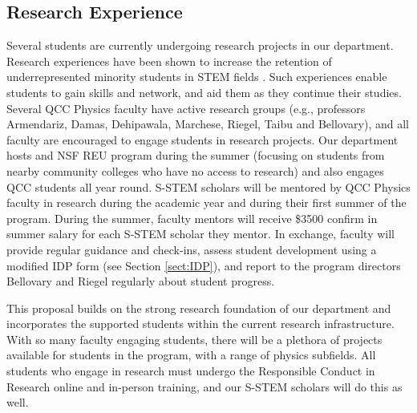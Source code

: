 \documentclass[12pt]{article}
\newcommand\new[1]{{\color{blue}#1}}
\begin{document}
\subsection{Research Experience}
\vspace{-2mm}
Several students are currently undergoing research projects in our department.  Research experiences have been shown to increase the retention of underrepresented minority students in STEM fields \citep{Graham,Russell}.   Such experiences  enable students to gain skills and network, and aid them as they continue their studies.  Several QCC Physics faculty have active research groups (e.g., professors Armendariz, Damas, Dehipawala, Marchese, Riegel, Taibu and Bellovary), and all faculty are encouraged to engage students in research projects.  Our department hosts and NSF REU program during the summer (focusing on students from nearby community colleges who have no access to research) and also engages QCC students all year round.  S-STEM scholars will be mentored by QCC Physics faculty in research during the academic year and during their first summer of the program.  During the summer, faculty mentors will receive \$3500 \new{confirm} in summer salary for each S-STEM scholar they mentor.  In exchange, faculty will provide regular guidance and check-ins, assess student development using a modified IDP form (see Section \ref{sect:IDP}), and report to the program directors Bellovary and Riegel regularly about student progress.  

This proposal builds on the strong research foundation of our department and incorporates the supported students within the current research infrastructure.  With so many faculty engaging students, there will be a plethora of projects available for students in the program, with a range of physics subfields.  All students who engage in research must undergo the Responsible Conduct in Research online and in-person training, and our S-STEM scholars will do this as well.
\vspace{-5mm}
\end{document}
